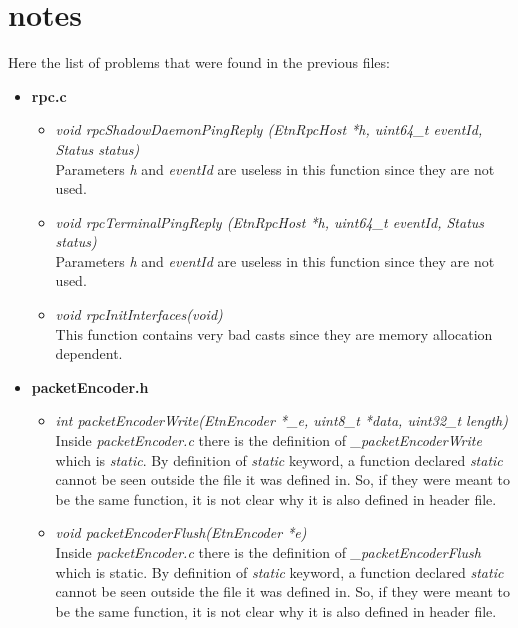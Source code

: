 \section{notes}
Here the list of problems that were found in the previous files:
\begin{itemize}

\item \textbf{rpc.c}
\begin{itemize}
\item \emph{void rpcShadowDaemonPingReply (EtnRpcHost *h, uint64\_t eventId, Status status)}\\
Parameters \emph{h} and \emph{eventId} are useless in this function since they are not used.

\item \emph{void rpcTerminalPingReply (EtnRpcHost *h, uint64\_t eventId, Status status)}\\
Parameters \emph{h} and \emph{eventId} are useless in this function since they are not used.

\item \emph{void rpcInitInterfaces(void)}\\
This function contains very bad casts since they are memory allocation dependent.
\end{itemize}

\item \textbf{packetEncoder.h}
\begin{itemize}
\item\emph{int packetEncoderWrite(EtnEncoder *\_e, uint8\_t *data, uint32\_t length)}\\
Inside \emph{packetEncoder.c} there is the definition of \emph{\_packetEncoderWrite} which is \emph{static}. By definition of \emph{static} keyword, a function declared \emph{static} cannot be seen outside the file it was defined in. So, if they were meant to be the same function, it is not clear why it is also defined in header file.

\item\emph{void packetEncoderFlush(EtnEncoder *e)}\\
Inside \emph{packetEncoder.c} there is the definition of \emph{\_packetEncoderFlush} which is static. By definition of \emph{static} keyword, a function declared \emph{static} cannot be seen outside the file it was defined in. So, if they were meant to be the same function, it is not clear why it is also defined in header file.
\end{itemize}


\end{itemize}
